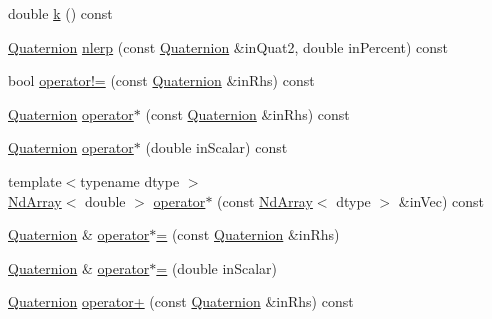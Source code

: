 \begin{DoxyCompactItemize}
\item 
double \mbox{\hyperlink{class_num_cpp_1_1_rotations_1_1_quaternion_aa82d6223b80d45bca7ddf0986acc4e0a}{k}} () const
\item 
\mbox{\hyperlink{class_num_cpp_1_1_rotations_1_1_quaternion}{Quaternion}} \mbox{\hyperlink{class_num_cpp_1_1_rotations_1_1_quaternion_a956f5c22b6c8096331c0900a18662ec0}{nlerp}} (const \mbox{\hyperlink{class_num_cpp_1_1_rotations_1_1_quaternion}{Quaternion}} \&in\+Quat2, double in\+Percent) const
\item 
bool \mbox{\hyperlink{class_num_cpp_1_1_rotations_1_1_quaternion_a8f2e6432eb688a850f86ec515e730d5a}{operator!=}} (const \mbox{\hyperlink{class_num_cpp_1_1_rotations_1_1_quaternion}{Quaternion}} \&in\+Rhs) const
\item 
\mbox{\hyperlink{class_num_cpp_1_1_rotations_1_1_quaternion}{Quaternion}} \mbox{\hyperlink{class_num_cpp_1_1_rotations_1_1_quaternion_a101006c45b6c33b3a251bbbc9169359f}{operator$\ast$}} (const \mbox{\hyperlink{class_num_cpp_1_1_rotations_1_1_quaternion}{Quaternion}} \&in\+Rhs) const
\item 
\mbox{\hyperlink{class_num_cpp_1_1_rotations_1_1_quaternion}{Quaternion}} \mbox{\hyperlink{class_num_cpp_1_1_rotations_1_1_quaternion_ac08faed4f8f2dbc2f0b74fed747ada01}{operator$\ast$}} (double in\+Scalar) const
\item 
{\footnotesize template$<$typename dtype $>$ }\\\mbox{\hyperlink{class_num_cpp_1_1_nd_array}{Nd\+Array}}$<$ double $>$ \mbox{\hyperlink{class_num_cpp_1_1_rotations_1_1_quaternion_a706c101d2cb79ea8d48cfe8de3dc5445}{operator$\ast$}} (const \mbox{\hyperlink{class_num_cpp_1_1_nd_array}{Nd\+Array}}$<$ dtype $>$ \&in\+Vec) const
\item 
\mbox{\hyperlink{class_num_cpp_1_1_rotations_1_1_quaternion}{Quaternion}} \& \mbox{\hyperlink{class_num_cpp_1_1_rotations_1_1_quaternion_a51b3dad20f0d2aa541a2d2890a9aca5b}{operator$\ast$=}} (const \mbox{\hyperlink{class_num_cpp_1_1_rotations_1_1_quaternion}{Quaternion}} \&in\+Rhs)
\item 
\mbox{\hyperlink{class_num_cpp_1_1_rotations_1_1_quaternion}{Quaternion}} \& \mbox{\hyperlink{class_num_cpp_1_1_rotations_1_1_quaternion_aa21c32b9337ccd120413593048cd890a}{operator$\ast$=}} (double in\+Scalar)
\item 
\mbox{\hyperlink{class_num_cpp_1_1_rotations_1_1_quaternion}{Quaternion}} \mbox{\hyperlink{class_num_cpp_1_1_rotations_1_1_quaternion_ae470095e7fd118597c6612f9e84cd9d3}{operator+}} (const \mbox{\hyperlink{class_num_cpp_1_1_rotations_1_1_quaternion}{Quaternion}} \&in\+Rhs) const

\end{DoxyCompactItemize}
